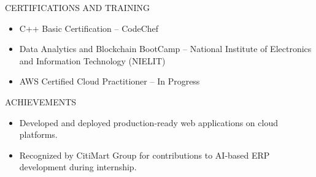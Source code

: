 \documentclass{resume}
\begin{document}

\begin{rSection}{CERTIFICATIONS AND TRAINING}
\begin{itemize}[leftmargin=*,nosep]
    \item C++ Basic Certification -- CodeChef
    \item Data Analytics and Blockchain BootCamp -- National Institute of Electronics and Information Technology (NIELIT)
    \item AWS Certified Cloud Practitioner -- In Progress
\end{itemize}
\end{rSection}

\begin{rSection}{ACHIEVEMENTS}
\begin{itemize}[leftmargin=*,nosep]
    \item Developed and deployed production-ready web applications on cloud platforms.
    \item Recognized by CitiMart Group for contributions to AI-based ERP development during internship.
\end{itemize}
\end{rSection}
\end{document}
